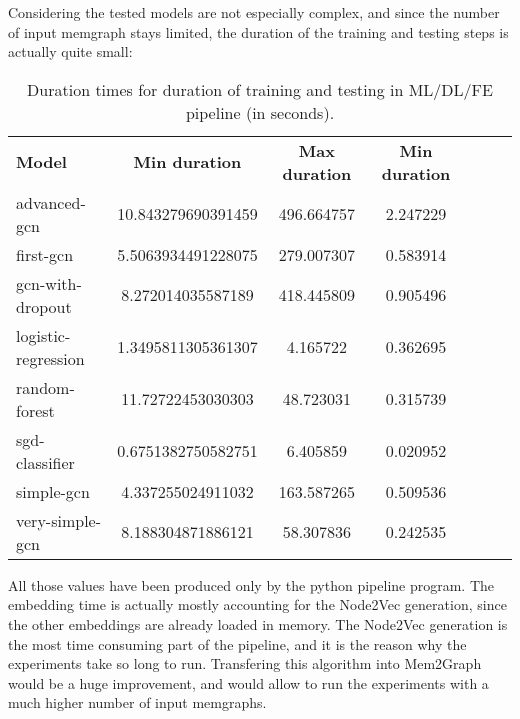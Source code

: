 Considering the tested models are not especially complex, and since the number of input memgraph stays limited, the duration of the training and testing steps is actually quite small:

\begin{table}[H]
    \centering
    \caption{Duration times for duration of training and testing in ML/DL/FE pipeline (in seconds).}
    \begin{tabular}{lcccccc}
      \textbf{Model}  & \textbf{Min duration} & \textbf{Max duration} & \textbf{Min duration} \\
        advanced-gcn & 10.843279690391459 & 496.664757 & 2.247229 \\
        first-gcn & 5.5063934491228075 & 279.007307 & 0.583914 \\
        gcn-with-dropout & 8.272014035587189 & 418.445809 & 0.905496 \\
        logistic-regression & 1.3495811305361307 & 4.165722 & 0.362695 \\
        random-forest & 11.72722453030303 & 48.723031 & 0.315739 \\
        sgd-classifier & 0.6751382750582751 & 6.405859 & 0.020952 \\
        simple-gcn & 4.337255024911032 & 163.587265 & 0.509536 \\
        very-simple-gcn & 8.188304871886121 & 58.307836 & 0.242535 \\
    \end{tabular}
\end{table}

All those values have been produced only by the python pipeline program. The embedding time is actually mostly accounting for the Node2Vec generation, since the other embeddings are already loaded in memory. The Node2Vec generation is the most time consuming part of the pipeline, and it is the reason why the experiments take so long to run. Transfering this algorithm into Mem2Graph would be a huge improvement, and would allow to run the experiments with a much higher number of input memgraphs.



